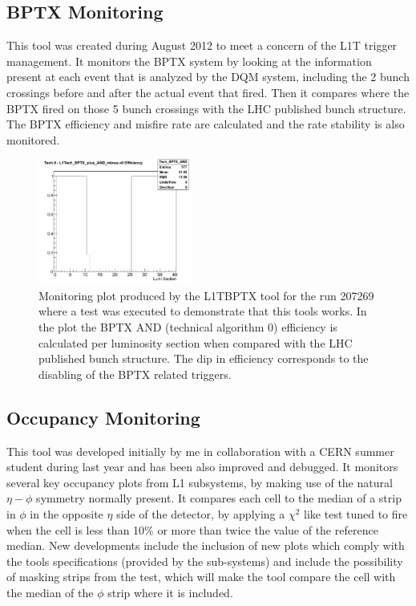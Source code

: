 \subsection{BPTX Monitoring}

This tool was created during August 2012 to meet a concern of the \gls{L1T} trigger management. It monitors the \gls{BPTX} system by looking at the information present at each event that 
is analyzed by the \gls{DQM} system, including the 2 bunch crossings before and after the actual event that fired. Then it 
compares where the \gls{BPTX} fired on those 5 bunch crossings with the LHC published bunch structure. The \gls{BPTX} efficiency 
and misfire rate are calculated and the rate stability is also monitored.

\begin{figure}[!htb]
\centering
\includegraphics[width=0.45\textwidth]{Chapter03/L1TOnline/Images/L1TBPTX_Tech_BPTX_AND.png}
\caption{Monitoring plot produced by the L1TBPTX tool for the run 207269 where a test was executed to demonstrate that 
this tools works. In the plot the BPTX AND (technical algorithm 0) efficiency is calculated per luminosity section 
when compared with the LHC published bunch structure. The dip in efficiency corresponds to the disabling of the BPTX 
related triggers.} 
\label{figure_ServiceWork_L1TBPTX}
\end{figure}

\subsection{Occupancy Monitoring}

This tool was developed initially by me in collaboration with a CERN summer student during last year and has been
also improved and debugged. It monitors several key occupancy plots from L1 subsystems, by making use of the natural
$\eta-\phi$ symmetry normally present. It compares each cell to the median of a strip in $\phi$ in the opposite $\eta$
side of the detector, by applying a $\chi^{2}$ like test tuned to fire when the cell is less than 10\% or more than
twice the value of the reference median. New developments include the inclusion of new plots which comply with the
tools specifications (provided by the sub-systems) and include the possibility of masking strips from the test, which 
will make the tool compare the cell with the median of the $\phi$ strip where it is included.

